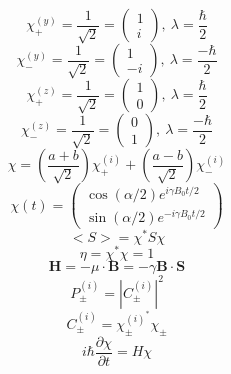 \documentclass[10pt]{article}
\begin{document}
\begin{multicols}{3}
\begin{equation*}
\chi_{+}^{(y)}=\frac{1}{\sqrt{2}}=
\begin{pmatrix}
1 \\ i
\end{pmatrix}
,\ \lambda=\frac{\hbar}{2}
\end{equation*}
\begin{equation*}
\chi_{-}^{(y)}=\frac{1}{\sqrt{2}}=
\begin{pmatrix}
1 \\ -i
\end{pmatrix}
,\ \lambda=\frac{-\hbar}{2}
\end{equation*}
\begin{equation*}
\chi_{+}^{(z)}=\frac{1}{\sqrt{2}}=
\begin{pmatrix}
1 \\ 0
\end{pmatrix}
,\ \lambda=\frac{\hbar}{2}
\end{equation*}
\begin{equation*}
\chi_{-}^{(z)}=\frac{1}{\sqrt{2}}=
\begin{pmatrix}
0 \\ 1
\end{pmatrix}
,\ \lambda=\frac{-\hbar}{2}
\end{equation*}
\begin{equation*}
\chi=\left(\frac{a+b}{\sqrt{2}}\right)\chi_{+}^{(i)}+\left(\frac{a-b}{\sqrt{2}}\right)\chi_{-}^{(i)}
\end{equation*}
\begin{equation*}
\chi(t)=
\begin{pmatrix}
\cos{(\alpha/2)}e^{i\gamma B_{0}t/2} \\ \sin{(\alpha/2)}e^{-i\gamma B_{0}t/2}
\end{pmatrix}
\end{equation*}
\begin{equation*}
<S>=\chi^{*}S\chi
\end{equation*}
\begin{equation*}
\eta=\chi^{*}\chi=1
\end{equation*}
\begin{equation*}
\textbf{H}=-\mu \cdot \textbf{B}=-\gamma \textbf{B} \cdot \textbf{S}
\end{equation*}
\begin{equation*}
P_{\pm}^{(i)}=|C_{\pm}^{(i)}|^2
\end{equation*}
\begin{equation*}
C_{\pm}^{(i)}=\chi_{\pm}^{(i)^{*}}\chi_{\pm}
\end{equation*}
\begin{equation*}
i\hbar\frac{\partial \chi}{\partial t}=H\chi
\end{equation*}
\end{multicols}
\end{document}
